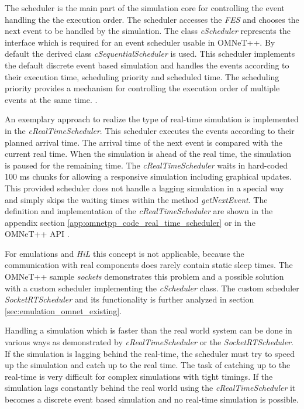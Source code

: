 The scheduler is the main part of the simulation core for controlling the event handling the the execution order.
The scheduler accesses the \emph{FES} and chooses the next event to be handled by the simulation.
The class \emph{cScheduler} represents the interface which is required for an event scheduler usable in OMNeT++.
By default the derived class \emph{cSequentialScheduler} is used.
This scheduler implements the default discrete event based simulation and handles the events according to their execution time, scheduling priority and scheduled time.
The scheduling priority provides a mechanism for controlling the execution order of multiple events at the same time. \cite[section 4.1]{omnet_manual}.

An exemplary approach to realize the type of real-time simulation is implemented in the \emph{cRealTimeScheduler}.
This scheduler executes the events according to their planned arrival time.
The arrival time of the next event is compared with the current real time.
When the simulation is ahead of the real time, the simulation is paused for the remaining time.
The \emph{cRealTimeScheduler} waits in hard-coded 100 ms chunks for allowing a responsive simulation including graphical updates.
This provided scheduler does not handle a lagging simulation in a special way and simply skips the waiting times within the method \emph{getNextEvent}. 
The definition and implementation of the \emph{cRealTimeScheduler} are shown in the appendix section \ref{app:omnetpp_code_real_time_scheduler} or in the OMNeT++ API \cite[cRealTimeScheduler]{omnet_api}.

For emulations and \emph{HiL} this concept is not applicable, because the communication with real components does rarely contain static sleep times.
The OMNeT++ sample \emph{sockets} demonstrates this problem and a possible solution with a custom scheduler implementing the \emph{cScheduler} class.
The custom scheduler \emph{SocketRTScheduler} and its functionality is further analyzed in section \ref{sec:emulation_omnet_existing}.

Handling a simulation which is faster than the real world system can be done in various ways as demonstrated by \emph{cRealTimeScheduler} or the \emph{SocketRTScheduler}.
If the simulation is lagging behind the real-time, the scheduler must try to speed up the simulation and catch up to the real time.
The task of catching up to the real-time is very difficult for complex simulations with tight timings.
If the simulation lags constantly behind the real world using the \emph{cRealTimeScheduler} it becomes a discrete event based simulation and no real-time simulation is possible.

